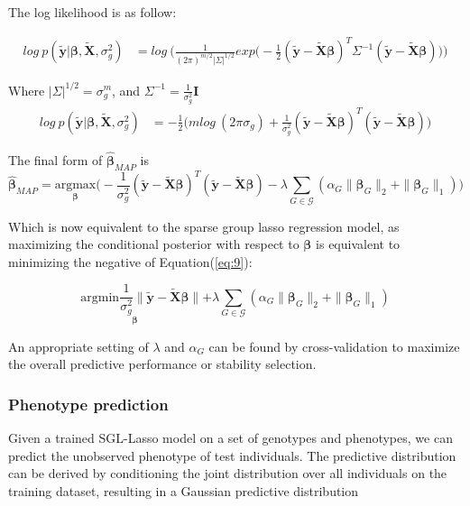 \documentclass[11pt]{article}
\theoremstyle{plain}
\theoremstyle{definition}
\theoremstyle{remark}
\begin{document}
The log likelihood is as follow:

\begin{equation*}
\begin{aligned}
log\ p(\bm{\tilde{y}}|\bm{\beta},\bm{\tilde{X}},\sigma_g^2)&=log\ \Bigg(\frac{1}{(2\pi)^{m/2}|\Sigma|^{1/2}}exp\Big(-\frac{1}{2}(\bm{\tilde{y}}-\bm{\tilde{X}\beta})^T\Sigma^{-1}(\bm{\tilde{y}}-\bm{\tilde{X}\beta})\Big)\Bigg)
\end{aligned}
\end{equation*}

Where $|\Sigma|^{1/2}=\sigma_g^m$, and $\Sigma^{-1}=\frac{1}{\sigma_g^2}\bm{I}$
\begin{equation*}
\begin{aligned}
log\ p(\bm{\tilde{y}}|\bm{\beta},\bm{\tilde{X}},\sigma_g^2)&=-\frac{1}{2}\Big(mlog\ (2\pi\sigma_g)+\frac{1}{\sigma_g^2}(\bm{\tilde{y}}-\bm{\tilde{X}\beta})^T(\bm{\tilde{y}}-\bm{\tilde{X}\beta})\Big)
\end{aligned}
\end{equation*}

The final form of $\hat{\bm\beta}_{MAP}$ is
\begin{equation}
\label{eq:9}
\hat{\bm\beta}_{MAP}=\underset{\bm{\beta}}{\mathrm{argmax}}\Big(-\frac{1}{\sigma_g^2}(\bm{\tilde{y}}-\bm{\tilde{X}\beta})^T(\bm{\tilde{y}}-\bm{\tilde{X}\beta})-\lambda\sum_{G\in\mathcal{G}}(\alpha_G\parallel\bm{\beta}_G\parallel_2+\parallel\bm{\beta}_G\parallel_1)\Big)
\end{equation}

Which is now equivalent to the sparse group lasso regression model, as maximizing the conditional posterior with respect to $\bm{\beta}$ is equivalent to minimizing the negative of Equation(\ref{eq:9}):

\begin{equation}
\underset{\bm{\beta}}{\mathrm{argmin}\frac{1}{\sigma_g^2}\parallel\bm{\tilde{y}}-\bm{\tilde{X}\beta}}\parallel+\lambda\sum_{G\in\mathcal{G}}(\alpha_G\parallel\bm{\beta}_G\parallel_2+\parallel\bm{\beta}_G\parallel_1)
\end{equation}

An appropriate setting of $\lambda$ and $\alpha_G$ can be found by cross-validation to maximize the overall predictive performance or stability selection.


\subsubsection{Phenotype prediction}
Given a trained SGL-Lasso model on a set of genotypes and phenotypes, we can predict the unobserved phenotype of test individuals. The predictive distribution can be derived by conditioning the joint distribution over all individuals on the training dataset, resulting in a Gaussian predictive distribution 
\end{document}
